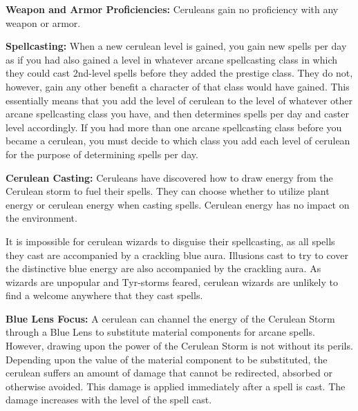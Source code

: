{
\textbf{Weapon and Armor Proficiencies:} Ceruleans gain no proficiency with any weapon or armor.

\textbf{Spellcasting:} When a new cerulean level is gained, you gain new spells per day as if you had also gained a level in whatever arcane spellcasting class in which they could cast 2nd-level spells before they added the prestige class. They do not, however, gain any other benefit a character of that class would have gained. This essentially means that you add the level of cerulean to the level of whatever other arcane spellcasting class you have, and then determines spells per day and caster level accordingly. If you had more than one arcane spellcasting class before you became a cerulean, you must decide to which class you add each level of cerulean for the purpose of determining spells per day.

\textbf{Cerulean Casting:} Ceruleans have discovered how to draw energy from the Cerulean storm to fuel their spells. They can choose whether to utilize plant energy or cerulean energy when casting spells. Cerulean energy has no impact on the environment.

It is impossible for cerulean wizards to disguise their spellcasting, as all spells they cast are accompanied by a crackling blue aura. Illusions cast to try to cover the distinctive blue energy are also accompanied by the crackling aura. As wizards are unpopular and Tyr-storms feared, cerulean wizards are unlikely to find a welcome anywhere that they cast spells.

\textbf{Blue Lens Focus:} A cerulean can channel the energy of the Cerulean Storm through a Blue Lens to substitute material components for arcane spells. However, drawing upon the power of the Cerulean Storm is not without its perils. Depending upon the value of the material component to be substituted, the cerulean suffers an amount of damage that cannot be redirected, absorbed or otherwise avoided. This damage is applied immediately after a spell is cast. The damage increases with the level of the spell cast.


}
